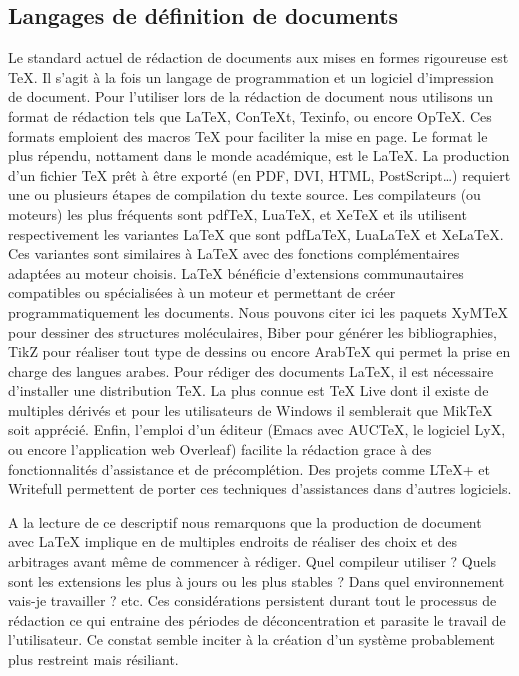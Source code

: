 \documentclass[a4paper,12pt]{article}
\begin{document}
\subsection{Langages de définition de documents}
\label{sec:orgcb60bc5}
Le standard actuel de rédaction de documents aux mises en formes rigoureuse est \TeX{}. Il s'agit à la fois un langage de programmation et un logiciel d'impression de document. Pour l'utiliser lors de la rédaction de document nous utilisons un format de rédaction tels que \LaTeX{}, ConTeXt, Texinfo, ou encore OpTeX. Ces formats emploient des macros \TeX{} pour faciliter la mise en page. Le format le plus répendu, nottament dans le monde académique, est le \LaTeX{}. La production d'un fichier \TeX{} prêt à être exporté (en PDF, DVI, HTML, PostScript\ldots{}) requiert une ou plusieurs étapes de compilation du texte source. Les compilateurs (ou moteurs) les plus fréquents sont pdfTeX, LuaTeX, et XeTeX et ils utilisent respectivement les variantes \LaTeX{} que sont pdfLaTeX, LuaLaTeX et XeLaTeX. Ces variantes sont similaires à \LaTeX{} avec des fonctions complémentaires adaptées au moteur choisis. \LaTeX{} bénéficie d'extensions communautaires compatibles ou spécialisées à un moteur et permettant de créer programmatiquement les documents. Nous pouvons citer ici les paquets XyMTeX pour dessiner des structures moléculaires, Biber pour générer les bibliographies, TikZ pour réaliser tout type de dessins ou encore ArabTeX qui permet la prise en charge des langues arabes. Pour rédiger des documents \LaTeX{}, il est nécessaire d'installer une distribution \TeX{}. La plus connue est \TeX{} Live dont il existe de multiples dérivés et pour les utilisateurs de Windows il semblerait que MikTeX soit apprécié. Enfin, l'emploi d'un éditeur (Emacs avec AUCTeX, le logiciel LyX, ou encore l'application web Overleaf) facilite la rédaction grace à des fonctionnalités d'assistance et de précomplétion. Des projets comme LTeX+\autocite{LtexplusLtexlsplus2025}  et Writefull\autocite{Writefull} permettent de porter ces techniques d'assistances dans d'autres logiciels.

A la lecture de ce descriptif nous remarquons que la production de document avec \LaTeX{} implique en de multiples endroits de réaliser des choix et des arbitrages avant même de commencer à rédiger. Quel compileur utiliser ? Quels sont les extensions les plus à jours ou les plus stables ? Dans quel environnement vais-je travailler ? etc. Ces considérations persistent durant tout le processus de rédaction ce qui entraine des périodes de déconcentration et parasite le travail de l'utilisateur. Ce constat semble inciter à la création d'un système probablement plus restreint mais résiliant. 
\end{document}
